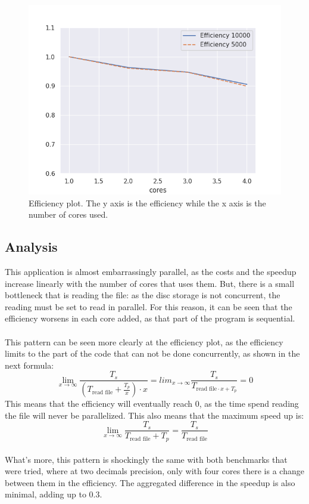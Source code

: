 \documentclass[11pt, a4paper]{article}
\begin{document}
\begin{figure}[H]
	\centering
	\includegraphics[width=0.7\linewidth]{plots/efficiency}
	\caption[Efficiency plot]{Efficiency plot. The y axis is the efficiency while the x axis is the number of cores used.}
	\label{fig:efficiency}
\end{figure}
	\subsection{Analysis}
	This application is almost embarrassingly parallel, as the costs and the speedup increase linearly with the number of cores that uses them. But, there is a small bottleneck that is reading the file: as the disc storage is not concurrent, the reading must be set to read in parallel. For this reason, it can be seen that the efficiency worsens in each core added, as that part of the program is sequential.\\
\\
This pattern can be seen more clearly at the efficiency plot, as the efficiency limits to the part of the code that can not be done concurrently, as shown in the next formula:
\[ \lim_{x \to \infty} \frac{T_s }{(T_{\text{read file}} +  \frac{T_p}{x}) \cdot x } = lim_{x \to \infty}\frac{T_s}{T_{\text{read file} \cdot x + T_p}} = 0\]
This means that the efficiency will eventually reach 0, as the time spend reading the file will never be parallelized. This also means that the maximum speed up is:
\[ \lim_{x \to \infty} \frac{T_s}{T_{\text{read file}} + T_p} = \frac{T_s}{T_{\text{read file}}}\]
\\
What's more, this pattern is shockingly the same with both benchmarks that were tried, where at two decimals precision, only with four cores there is a change between them in the efficiency. The aggregated difference in the speedup is also minimal, adding up to $0.3$.
\end{document}
